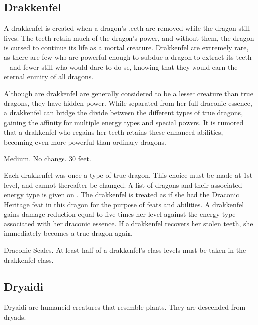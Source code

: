 \subsection{Drakkenfel}

A drakkenfel is created when a dragon's teeth are removed while the dragon still lives. The teeth retain much of the dragon's power, and without them, the dragon is cursed to continue its life as a mortal creature. Drakkenfel are extremely rare, as there are few who are powerful enough to subdue a dragon to extract its teeth -- and fewer still who would dare to do so, knowing that they would earn the eternal enmity of all dragons.

Although are drakkenfel are generally considered to be a lesser creature than true dragons, they have hidden power. While separated from her full draconic essence, a drakkenfel can bridge the divide between the different types of true dragons, gaining the affinity for multiple energy types and special powers. It is rumored that a drakkenfel who regains her teeth retains these enhanced abilities, becoming even more powerful than ordinary dragons.

 Medium.
 No change.
 30 feet.
\begin{itemize}
     Each drakkenfel was once a type of true dragon. This choice must be made at 1st level, and cannot thereafter be changed. A list of dragons and their associated energy type is given on . The drakkenfel is treated as if she had the Draconic Heritage feat in this dragon for the purpose of feats and abilities.
     A drakkenfel gains damage reduction equal to five times her level against the energy type associated with her draconic essence.
     If a drakkenfel recovers her stolen teeth, she immediately becomes a true dragon again.
\end{itemize}
 Draconic Scales.
 At least half of a drakkenfel's class levels must be taken in the drakkenfel class.

\subsection{Dryaidi}

Dryaidi are humanoid creatures that resemble plants. They are descended from dryads.

